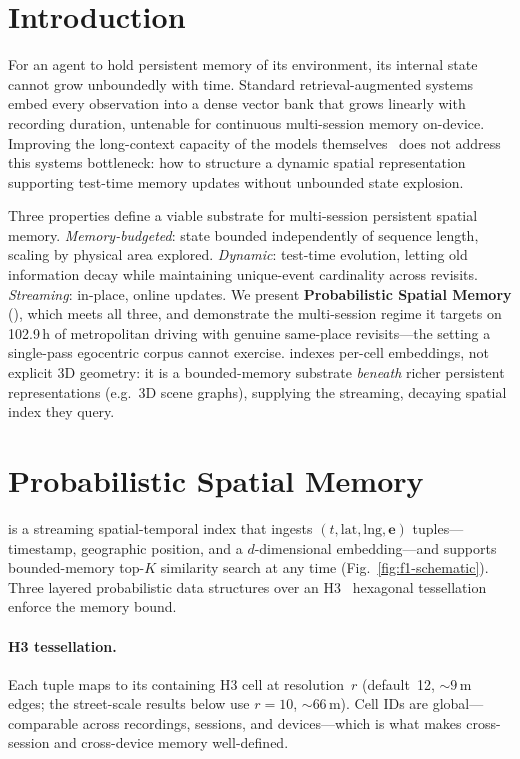 
\section{Introduction}
\label{sec:intro}

For an agent to hold persistent memory of its environment, its internal
state cannot grow unboundedly with time. Standard retrieval-augmented
systems embed every observation into a dense vector bank that grows
linearly with recording duration, untenable for continuous multi-session
memory on-device. Improving the long-context capacity of the models
themselves~\cite{arora2024linear,chen2024vljepa} does not address this
systems bottleneck: how to structure a dynamic spatial representation
supporting test-time memory updates without unbounded state explosion.

Three properties define a viable substrate for multi-session persistent
spatial memory. \emph{Memory-budgeted}: state bounded independently of
sequence length, scaling by physical area explored. \emph{Dynamic}:
test-time evolution, letting old information decay while maintaining
unique-event cardinality across revisits. \emph{Streaming}: in-place,
online updates. We present \textbf{Probabilistic Spatial Memory}
(\psm{}), which meets all three, and demonstrate the multi-session regime
it targets on 102.9\,h of metropolitan driving with genuine same-place
revisits---the setting a single-pass egocentric corpus cannot exercise.
\psm{} indexes per-cell embeddings, not explicit 3D geometry: it is a
bounded-memory substrate \emph{beneath} richer persistent representations
(e.g.\ 3D scene graphs), supplying the streaming, decaying spatial index
they query.

\section{Probabilistic Spatial Memory}
\label{sec:method}

\psm{} is a streaming spatial-temporal index that ingests
$(t, \mathrm{lat}, \mathrm{lng}, \mathbf{e})$ tuples---timestamp,
geographic position, and a $d$-dimensional embedding---and supports
bounded-memory top-$K$ similarity search at any time
(Fig.~\ref{fig:f1-schematic}). Three layered probabilistic data structures
over an H3~\cite{brodsky2018h3} hexagonal tessellation enforce the memory
bound.

\paragraph{H3 tessellation.}
Each tuple maps to its containing H3 cell at resolution~$r$ (default~12,
${\sim}9$\,m edges; the street-scale results below use $r{=}10$,
${\sim}66$\,m). Cell IDs are global---comparable across recordings,
sessions, and devices---which is what makes cross-session and
cross-device memory well-defined.

